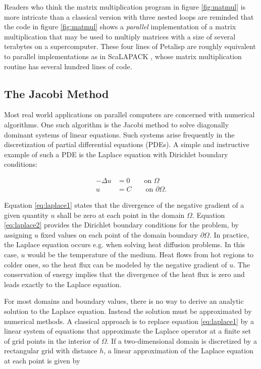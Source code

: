 Readers who think the matrix multiplication program in figure
\ref{fig:matmul} is more intricate than a classical version with three
nested loops are reminded that the code in figure \ref{fig:matmul} shows a
\emph{parallel} implementation of a matrix multiplication that may be used
to multiply matrices with a size of several terabytes on a supercomputer.
These four lines of Petalisp are roughly equivalent to parallel
implementations as in ScaLAPACK \cite{slug}, whose matrix multiplication
routine has several hundred lines of code.

\subsection{The Jacobi Method}

Most real world applications on parallel computers are concerned with
numerical algorithms. One such algorithm is the Jacobi method to solve
diagonally dominant systems of linear equations. Such systems arise
frequently in the discretization of partial differential equations
(PDEs). A simple and instructive example of such a PDE is the Laplace
equation with Dirichlet boundary conditions:

\begin{align}
- \Delta u &= 0 \qquad \text{on } \Omega \label{eq:laplace1} \\
 u &= C \qquad \text{on } \partial\Omega. \label{eq:laplace2}
\end{align}

\noindent Equation \ref{eq:laplace1} states that the divergence of the negative
gradient of a given quantity $u$ shall be zero at each point in the domain
$\Omega$. Equation \ref{eq:laplace2} provides the Dirichlet boundary conditions
for the problem, by assigning $u$ fixed values on each point of the domain
boundary $\partial\Omega$. In practice, the Laplace equation occurs e.g. when solving
heat diffusion problems. In this case, $u$ would be the temperature of the
medium. Heat flows from hot regions to colder ones, so the heat flux can be
modeled by the negative gradient of $u$. The conservation of energy implies
that the divergence of the heat flux is zero and leads exactly to the
Laplace equation.

For most domains and boundary values, there is no way to derive an analytic
solution to the Laplace equation. Instead the solution must be approximated
by numerical methods. A classical approach is to replace equation
\ref{eq:laplace1} by a linear system of equations that approximate the
Laplace operator at a finite set of grid points in the interior of $\Omega$. If
a two-dimensional domain is discretized by a rectangular grid with distance
$h$, a linear approximation of the Laplace equation at each point is given
by

